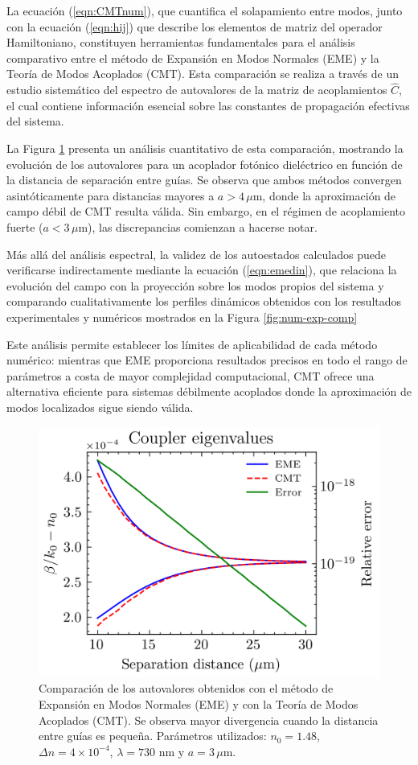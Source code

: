 La ecuación (\ref{eqn:CMTnum}), que cuantifica el solapamiento entre modos, junto con la ecuación (\ref{eqn:hij}) que describe los elementos de matriz del operador Hamiltoniano, constituyen herramientas fundamentales para el análisis comparativo entre el método de Expansión en Modos Normales (EME) y la Teoría de Modos Acoplados (CMT). Esta comparación se realiza a través de un estudio sistemático del espectro de autovalores de la matriz de acoplamientos $\hat{C}$, el cual contiene información esencial sobre las constantes de propagación efectivas del sistema. 

La Figura \ref{fig:EMECMT} presenta un análisis cuantitativo de esta comparación, mostrando la evolución de los autovalores para un acoplador fotónico dieléctrico en función de la distancia de separación entre guías. Se observa que ambos métodos convergen asintóticamente para distancias mayores a $a > 4\,\mu$m, donde la aproximación de campo débil de CMT resulta válida. Sin embargo, en el régimen de acoplamiento fuerte ($a < 3\,\mu$m), las discrepancias comienzan a hacerse notar.

Más allá del análisis espectral, la validez de los autoestados calculados puede verificarse indirectamente mediante la ecuación (\ref{eqn:emedin}), que relaciona la evolución del campo con la proyección sobre los modos propios del sistema y comparando cualitativamente los perfiles dinámicos obtenidos con los resultados experimentales y numéricos mostrados en la Figura \ref{fig:num-exp-comp}

Este análisis permite establecer los límites de aplicabilidad de cada método numérico: mientras que EME proporciona resultados precisos en todo el rango de parámetros a costa de mayor complejidad computacional, CMT ofrece una alternativa eficiente para sistemas débilmente acoplados donde la aproximación de modos localizados sigue siendo válida.
\begin{figure}[h]
    \centering
    \includegraphics[width=0.65\linewidth]{codigo/dimol/coupler.png}
    \caption[Comparación entre EME y CMT.]{Comparación de los autovalores obtenidos con el método de Expansión en Modos Normales (EME) y con la Teoría de Modos Acoplados (CMT). Se observa mayor divergencia cuando la distancia entre guías es pequeña. Parámetros utilizados: $n_0=1.48$, $\Delta n = 4\times10^{-4}$, $\lambda = 730$ nm y $a = 3\,\mu$m.}
    \label{fig:EMECMT}
\end{figure}



